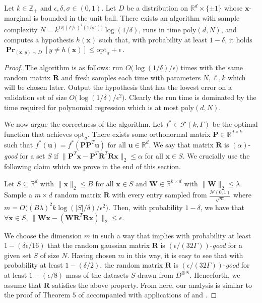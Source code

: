 \documentclass{theoretics}
\newcommand\twonorm[1]{\|#1\|_2}
\renewcommand\vec[1]{\mathbf{#1}}
\DeclareMathOperator*{\pr}{\mathbf{Pr}}
\newcommand{\R}{\mathbb{R}}
\newcommand{\eps}{\epsilon}
\newcommand{\poly}{\mathrm{poly}}
\newcommand{\opt}{\mathrm{opt}}
\newcommand{\1}{\Ind}
\newcommand{\smoothopt}{\mathrm{opt}_{\sigma}}
\newcommand{\x}{\vec x}
\newcommand{\vu}{\vec u}
\newcommand{\F}{\mathcal{F}}
\newcommand{\Gauss}{\mathcal{N}}
\newcommand{\Djoint}{D}
\begin{document}
\begin{theorem}
\label{thm:random_proj_bounded}
    Let $k \in \mathbb Z_+$ and $\epsilon, \delta,\sigma \in (0,1)$. Let $D$ be a distribution on $\R^d\times \{\pm 1\}$ whose $\x$-marginal is bounded in the unit ball.  There exists an algorithm with sample complexity $N = k^{\tilde{O}\big((\Gamma/\epsilon)^4(1/\sigma^2)\big)}\log (1/\delta)$, runs in time $\poly(d,N)$, and computes a hypothesis $h(\x)$ such that, with probability at least $1-\delta$, it holds
    $ \pr_{(\x, y) \sim \Djoint}[y\neq h(\x)] \le \opt_\sigma + \eps\,$. %
\end{theorem}
\begin{proof}
The algorithm is as follows: run  $O\bigl(\log(1/\delta)/\epsilon\bigr)$ times with the same random matrix $\vec R$ and fresh samples each time with parameters $N,\ell,k$ which will be chosen later. Output the hypothesis that has the lowest error on a validation set of size $O\bigl(\log(1/\delta)/\epsilon^2\bigr)$. Clearly the run time is dominated by the time required for polynomial regression which is at most $\poly(d,N)$.

We now argue the correctness of the algorithm. Let $f^*\in \F(k,\Gamma)$ be the optimal function that achieves $\smoothopt$. There exists some orthonormal matrix $\vec P\in\R^{d\times k}$ such that $f^*(\vu)=f^*(\vec P \vec P^T \vu)$ for all $\vu\in \R^{d}$. We say that matrix $\vec R$ is $(\alpha)$-\textit{good} for a set $S$ if $\twonorm{\vec P^T \x-\vec P^T\vec R^T\vec R\x}\leq \alpha$ for all $\x\in S$. We crucially use the following claim which we prove in the end of this section.
\begin{lemma}
\label{lem:dim_red_norm}
     Let $S\subseteq \R^d$ with $\twonorm{\x}\leq B$ for all $\x\in S$ and $\vec W\in \R^{k\times d}$ with $\twonorm{\vec W}\leq \lambda$. Sample a $m\times d$ random matrix $\vec R$ with every entry sampled from $\frac{\Gauss(0,1)}{\sqrt{m}}$  where $m=O\bigl((B\lambda)^2k\log (|S|/\delta)/\epsilon^2\bigr)$. Then, with probability $1-\delta$, we have that $\forall \x\in S$, $\twonorm{\vec W\x - (\vec W\vec R^T\vec R\x)}\leq \epsilon$.
\end{lemma}

We choose the dimension $m$ in such a way that  implies with probability at least  $1-(\delta\epsilon/16)$ that the random gaussian matrix $\vec R$ is $(\epsilon/(32\Gamma))$-\textit{good} for a given set $S$ of size $N$. Having chosen $m$ in this way, it is easy to see that with probability at least $1-(\delta/2)$, the random matrix $\vec R$ is $(\epsilon/(32\Gamma))$-\textit{good} for at least $1-(\epsilon/8)$ mass of the datasets $S$ drawn from $D^{\otimes N}$. Henceforth, we assume that $\vec R$ satisfies the above property. From here, our analysis is similar to the proof of Theorem $5$ of \cite{KKMS:05} accompanied with applications of  and . 


\end{proof}
\end{document}
